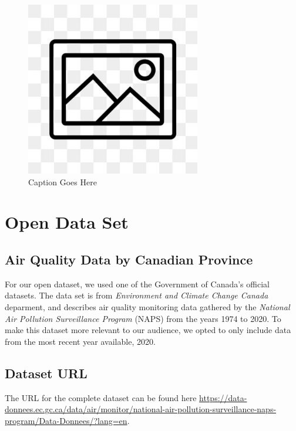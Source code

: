 \documentclass[12pt, letterpaper]{article}
\begin{document}
\begin{figure}[htbp]
	\centering
	\includegraphics[width=3in]{images/placeholder.jpg}
	\caption{Caption Goes Here}
 \end{figure}

 \newpage

\section{Open Data Set}

\subsection*{Air Quality Data by Canadian Province}
For our open dataset, we used one of the Government of Canada's official datasets. The data set is from \textit{Environment and Climate Change Canada} deparment, and describes air quality monitoring data gathered by the \textit{National Air Pollution Surveillance Program} (NAPS) from the years 1974 to 2020. To make this dataset more relevant to our audience, we opted to only include data from the most recent year available, 2020.

\subsection*{Dataset URL}
The URL for the complete dataset can be found here \url{https://data-donnees.ec.gc.ca/data/air/monitor/national-air-pollution-surveillance-naps-program/Data-Donnees/?lang=en}.
\end{document}
